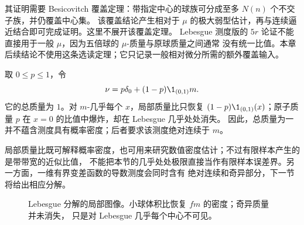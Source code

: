 其证明需要 Besicovitch 覆盖定理：带指定中心的球族可分成至多 $N(n)$ 个不交子族，并仍覆盖中心集。
该覆盖结论产生相对于 $\mu$ 的极大弱型估计，再与连续逼近结合即可完成证明。这里不展开该覆盖定理。
Lebesgue 测度版的 $5r$ 论证不能直接用于一般 $\mu$，因为五倍球的 $\mu$-质量与原球质量之间通常
没有统一比值。本章后续结论不使用这条选读定理；它只记录一般相对微分所需的额外覆盖输入。

\begin{remark}[混合测度的局部密度]
取 $0\le p\le1$，令
\[
 \nu=p\delta_0+(1-p)\1_{(0,1)}m.
\]
它的总质量为 $1$。对 $m$-几乎每个 $x$，局部质量比只恢复
$(1-p)\1_{(0,1)}(x)$；原子质量 $p$ 在 $x=0$ 的比值中爆炸，却在 Lebesgue 几乎处处消失。
因此，总质量为一并不蕴含测度具有概率密度；后者要求该测度绝对连续于 $m$。
\end{remark}

局部质量比既可解释概率密度，也可用来研究数值密度估计；不过有限样本产生的是带带宽的近似比值，
不能把本节的几乎处处极限直接当作有限样本误差界。另一方面，一维有界变差函数的导数测度会同时含有
绝对连续和奇异部分，下一节将给出相应分解。

\begin{figure}[htbp]
\centering
{}
\caption{Lebesgue 分解的局部图像。小球体积比恢复 $fm$ 的密度；奇异质量并未消失，
只是对 Lebesgue 几乎每个中心不可见。}
\label{fig:4-1-local-density-decomposition}
\end{figure}

